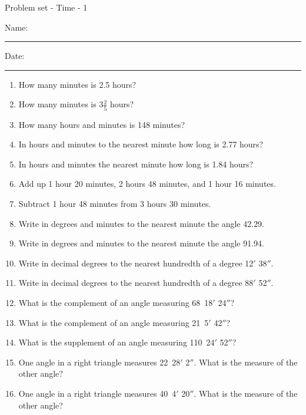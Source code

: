 \documentclass[12pt,fleqn]{article} %
\begin{document}
\pagestyle{empty} %
		\newcommand{\spacing}{\vspace{0.70in}}
\begin{center}
          Problem set - Time - 1 \\[0.5in]
\end{center}
  \vspace{0.25in}

Name: \rule{4in}{0.005in} Date: \rule{1.4in}{0.005in} 

\begin{enumerate}

  \item How many minutes is 2.5 hours? 
  \spacing

  \item How many minutes is 3$\frac{2}{5}$ hours? 
  \spacing

  \item How many hours and minutes is 148 minutes? 
  \spacing

  \item In hours and minutes to the nearest minute how long is 2.77 hours? 
  \spacing

  \item In hours and minutes the nearest minute how long is 1.84 hours? 
  \spacing

  \item Add up 1 hour 20 minutes, 2 hours 48 minutes, and 1 hour 16 minutes.
  \spacing

  \item Subtract 1 hour 48 minutes from 3 hours 30 minutes.
  \spacing

  \item Write in degrees and minutes to the nearest minute the angle 42.29\degree. 
  \spacing

  \item Write in degrees and minutes to the nearest minute the angle 91.94\degree. 
  \spacing

  \item Write in decimal degrees to the nearest hundredth of a degree 12$'$ 38$''$. 
  \spacing

  \item Write in decimal degrees to the nearest hundredth of a degree 88$'$ 52$''$. 
  \spacing

  \item What is the complement of an angle measuring 68\degree\ 18$'$ 24$''$?
  \spacing

  \item What is the complement of an angle measuring 21\degree\ 5$'$ 42$''$?
  \spacing

  \item What is the supplement of an angle measuring 110\degree\ 24$'$ 52$''$?
  \spacing

  \item One angle in a right triangle measures 22\degree\ 28$'$ 2$''$. What is the measure of the other angle? 
  \spacing

  \item One angle in a right triangle measures 40\degree\ 4$'$ 20$''$. What is the measure of the other angle? 
  \spacing

\end{enumerate}
\end{document}
